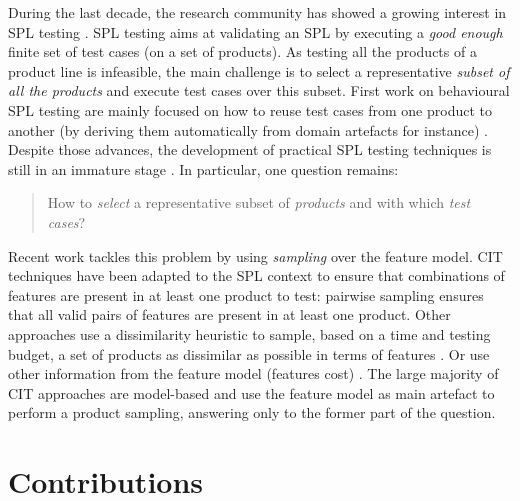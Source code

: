 During the last decade, the research community has showed a growing interest in SPL testing \cite{Heradio2015}. 
SPL testing aims at validating an SPL by executing a \textit{good enough} finite set of test cases (on a set of products). 
As testing all the products of a product line is infeasible, the main challenge is to select a representative \emph{subset of all the products} and execute test cases over this subset. First work on behavioural SPL testing are mainly focused on how to reuse test cases from one product to another (by deriving them automatically from domain artefacts for instance) \cite{Heradio2015,Oster2011}. Despite those advances, the development of practical SPL testing techniques is still in an immature stage \cite{Engstrom2011,Machado2014}. In particular, one question remains: 

\begin{quote}
How to \emph{select} a representative subset of \emph{products} and with which \emph{test cases}?
\end{quote}

Recent work tackles this problem by using \emph{sampling} over the feature model. \Gls{CIT} techniques have been adapted to the SPL context \cite{Cohen2008,Perrouin2011,PerezLamancha2010,Hervieu2011,Johansen2012b,Lopez-Herrejon2013} to ensure that combinations of features are present in at least one product to test: \eg pairwise sampling ensures that all valid pairs of features are present in at least one product. Other approaches use a dissimilarity heuristic to sample, based on a time and testing budget, a set of products as dissimilar as possible in terms of features \cite{Henard2014a,Al-Hajjaji2016}. Or use other information from the feature model (\eg features cost) \cite{Ensan2012,Henard2013a,Sayyad2013a,Sanchez2013}.
The large majority of \gls{CIT} approaches are model-based and use the feature model as main artefact to perform a product sampling, answering only to the former part of the question.


\section{Contributions}

   

